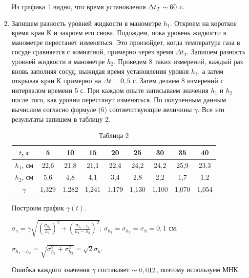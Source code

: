 \documentclass[a4paper,12pt]{article} %
\begin{document}
\begin{enumerate}
Из графика 1 видно, что время установления $\Delta t_{T} \thicksim 60 $ c.


\item Запишем разность уровней жидкости в манометре $h_{1}$. Откроем на короткое время кран К и закроем его снова. Подождем, пока уровень жидкости в манометре перестанет изменяться. Это произойдет, когда температура газа в сосуде сравняется с комнатной, примерно через время $\Delta t_{T}$. Запишем разность уровней жидкости в манометре $h_{2}$.  Проведем 8 таких измерений, каждый раз вновь заполняя сосуд, выжидая время установления уровня $h_{1}$, а затем открывая кран К примерно на $\Delta t = 0,5$ с. Затем делаем 8 измерений с интервалом времени 5 с. При каждом опыте записываем значения $h_{1}$ и $h_{2}$ после того, как уровни перестанут изменяться. По полученным данным вычислим согласно формуле (6) соответствующие величины $\gamma$. Все эти результаты запишем в таблицу 2.

\begin{table}[h!]
	\centering
	\begin{tabular}{|c|c|c|c|c|c|c|c|c|}
		\hline
		$t$, с      & 5    & 10   & 15   & 20   & 25   & 30   & 35   & 40   \\ \hline
		$h_{1}$, см & 22,6 & 21,8 & 21,1 & 22,4 & 24,2 & 24,2 & 25,9 & 23,3 \\ \hline
		$h_{2}$, см & 5,6  & 4,8  & 4,1  & 3,4  & 2,8  & 2,2  & 1,7  & 1,2  \\ \hline
		$\gamma$    & 1,329 & 1,282 & 1,241 & 1,179 & 1,130 & 1,100 & 1,070 & 1,054 \\ \hline
	\end{tabular}
\caption*{Таблица 2}
\end{table}

\newpage
Построим график $\gamma(t)$.

$\sigma_{\gamma} = \gamma \sqrt{\left(\frac{\sigma_{h_{1}}}{h_{1}}\right)^2 + \left(\frac{\sigma_{h_{1} - h_{2}}}{h_{1} - h_{2}}\right)^2}$;  \hspace{30mm}   $\sigma_{h_{1}} = \sigma_{h_{2}} = \sigma_{h} = 0,1$ см.
\vspace{7mm}

$\sigma_{h_{1} - h_{2}} = \sqrt{\sigma_{h_{1}}^2 + \sigma_{h_{2}}^2} = \sqrt{2}\sigma_{h}$.


Ошибка каждого значения $\gamma$ составляет $\thicksim 0,012$, поэтому используем МНК.


\end{enumerate}
\end{document}
